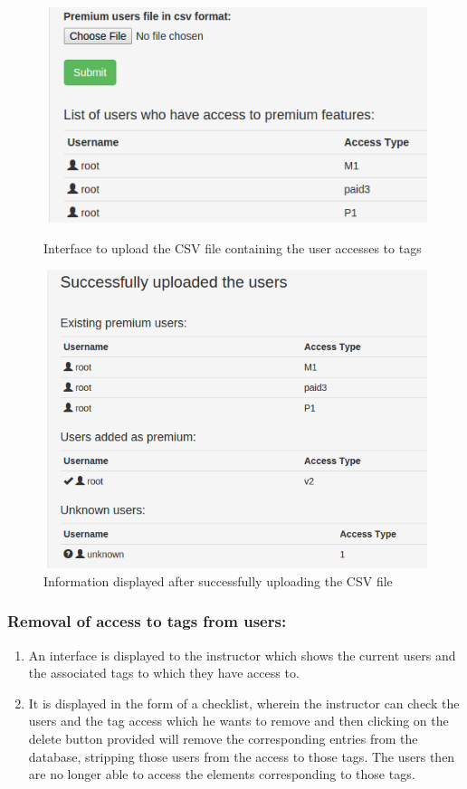 \begin{figure}
\centering
\includegraphics[width=0.7\linewidth]{./media/CSVupload}
\caption{Interface to upload the CSV file containing the user accesses to tags}
\label{fig:CSVupload}
\vspace{1cm}
\includegraphics[width=0.7\linewidth]{./media/usertaguploadsuccess}
\caption{Information displayed after successfully uploading the CSV file}
\label{fig:usertaguploadsuccess}
\end{figure}

\subsubsection*{Removal of access to tags from users:}

\begin{enumerate}
	\item An interface is displayed to the instructor which shows the current users and the associated tags to which they have access to.
	\item It is displayed in the form of a checklist, wherein the instructor can check the users and the tag access which he wants to remove and then clicking on the delete button provided will remove the corresponding entries from the database, stripping those users from the access to those tags. The users then are no longer able to access the elements corresponding to those tags.
\end{enumerate}

